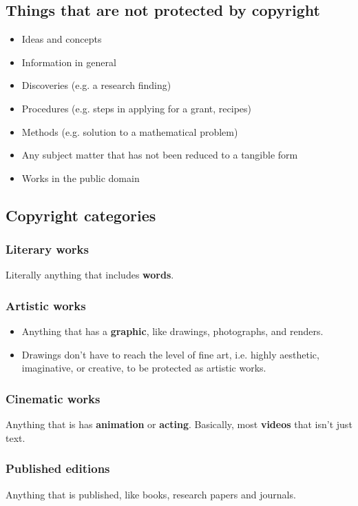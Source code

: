\documentclass[11pt]{article}
\begin{document}
\subsection{Things that are not protected by copyright}
\label{sec:orgcbeae4d}
\begin{itemize}
\item Ideas and concepts
\item Information in general
\item Discoveries (e.g. a research finding)
\item Procedures (e.g. steps in applying for a grant, recipes)
\item Methods (e.g. solution to a mathematical problem)
\item Any subject matter that has not been reduced to a tangible form
\item Works in the public domain
\end{itemize}
\subsection{Copyright categories}
\label{sec:orgf79e888}

\subsubsection{Literary works}
\label{sec:orgf1d81a0}
Literally anything that includes \textbf{words}.
\subsubsection{Artistic works}
\label{sec:orgbcd4673}
\begin{itemize}
\item Anything that has a \textbf{graphic}, like drawings, photographs, and renders.
\item Drawings don't have to reach the level of fine art, i.e. highly aesthetic, imaginative, or creative, to be protected as artistic works.
\end{itemize}
\subsubsection{Cinematic works}
\label{sec:orgb762c69}
Anything that is has \textbf{animation} or \textbf{acting}. Basically, most \textbf{videos} that isn't just text.
\subsubsection{Published editions}
\label{sec:orgd9de03b}
Anything that is published, like books, research papers and journals.
\end{document}
